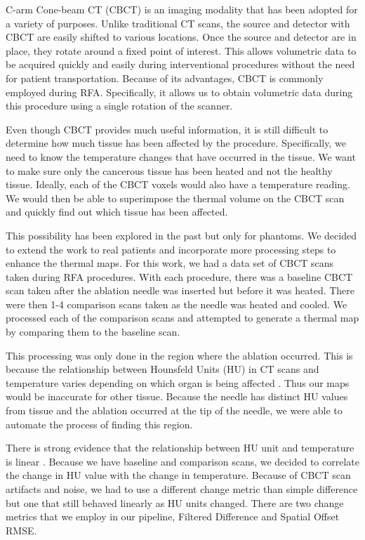 \documentclass[]{spie}  %
\begin{document}
C-arm Cone-beam CT (CBCT) is an imaging modality that has been adopted for a variety of purposes\cite{Orth08}. Unlike traditional CT scans, the source and detector with CBCT are easily shifted to various locations. Once the source and detector are in place, they rotate around a fixed point of interest. This allows volumetric data to be acquired quickly and easily during interventional procedures without the need for patient transportation. Because of its advantages, CBCT is commonly employed during RFA. Specifically, it allows us to obtain volumetric data during this procedure using a single rotation of the scanner. 

Even though CBCT provides much useful information, it is still difficult to determine how much tissue has been affected by the procedure. Specifically, we need to know the temperature changes that have occurred in the tissue\cite{Li13}. We want to make sure only the cancerous tissue has been heated and not the healthy tissue. Ideally, each of the CBCT voxels would also have a temperature reading. We would then be able to superimpose the thermal volume on the CBCT scan and quickly find out which tissue has been affected.

This possibility has been explored in the past \cite{Li13} but only for phantoms. We decided to extend the work to real patients and incorporate more processing steps to enhance the thermal maps. For this work, we had a data set of CBCT scans taken during RFA procedures. With each procedure, there was a baseline CBCT scan taken after the ablation needle was inserted but before it was heated. There were then 1-4 comparison scans taken as the needle was heated and cooled. We processed each of the comparison scans and attempted to generate a thermal map by comparing them to the baseline scan.

This processing was only done in the region where the ablation occurred. This is because the relationship between Hounsfeld Units (HU) in CT scans and temperature varies depending on which organ is being affected \cite{Fani14}. Thus our maps would be inaccurate for other tissue. Because the needle has distinct HU values from tissue and the ablation occurred at the tip of the needle, we were able to automate the process of finding this region. 

There is strong evidence that the relationship between HU unit and temperature is linear \cite{Fani14}. Because we have baseline and comparison scans, we decided to correlate the change in HU value with the change in temperature. Because of CBCT scan artifacts and noise, we had to use a different change metric than simple difference but one that still behaved linearly as HU units changed. There are two change metrics that we employ in our pipeline, Filtered Difference and Spatial Offset RMSE.  
\end{document}
